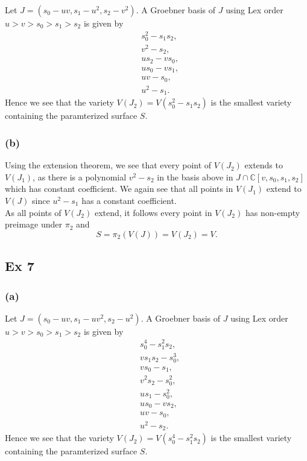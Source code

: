 \documentclass{article}
\theoremstyle{definition}
\newcommand{\C}{\mathbb{C}}
\begin{document}
Let $J = (s_0 - uv, s_1 - u^2, s_2 - v^2)$. A Groebner basis of $J$ using Lex
order $u > v > s_0 > s_1 > s_2$ is given by 
\begin{align*}
	&s_{0}^{2}-s_{1}s_{2}, \\
	&v^{2}-s_{2}, \\
	&us_{2}-vs_{0}, \\
	&us_{0}-vs_{1}, \\
	&uv-s_{0}, \\
	&u^{2}-s_{1}.
\end{align*}
Hence we see that the variety $V(J_2) = V(s_0^{2} - s_1s_2)$ is the smallest
variety containing the paramterized surface $S$.

\subsubsection*{(b)}

Using the extension theorem, we see that every point of $V(J_2)$ extends to
$V(J_1)$, as there is a polynomial $v^{2} - s_2$ in the basis above in $J \cap
\C[v,s_0,s_1,s_2]$ which has constant coefficient. We again see that all points
in $V(J_1)$ extend to $V(J)$ since $u^{2} - s_1$ has a constant coefficient. \\

As all points of $V(J_2)$ extend, it follows every point in $V(J_2)$ has
non-empty preimage under $\pi_2$ and
\[
	S = \pi_2(V(J)) = V(J_2) = V.
\]

\subsection*{Ex 7}
\subsubsection*{(a)}

Let $J = (s_0 - uv, s_1 - uv^2, s_2 - u^2)$. A Groebner basis of $J$ using Lex
order $u > v > s_0 > s_1 > s_2$ is given by 
\begin{align*}
	&s_{0}^{4}-s_{1}^{2}s_{2}, \\
	&vs_{1}s_{2}-s_{0}^{3}, \\
	&vs_{0}-s_{1}, \\
	&v^{2}s_{2}-s_{0}^{2}, \\
	&us_{1}-s_{0}^{2}, \\
	&us_{0}-vs_{2}, \\
	&uv-s_{0}, \\
	&u^{2}-s_{2}.
\end{align*}
Hence we see that the variety $V(J_2) = V(s_0^{4} - s_1^2s_2)$ is the smallest
variety containing the paramterized surface $S$.
\end{document}
